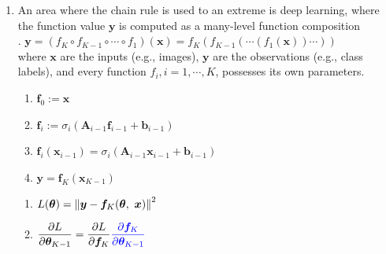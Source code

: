 \begin{enumerate}
    \item An area where the chain rule is used to an extreme is deep learning, where the function value $\bm{y}$ is computed as a many-level function composition
    \hfill \cite{mfml/book/mml/Deisenroth-Faisal-Ong}
    \\
    .\hfill
    $
        \bm{y}
        = (f_K \circ f_{K-1} \circ \cdots \circ f_1)(\bm{x})
        = f_K (f_{K-1}(\cdots (f_1(\bm{x}))\cdots))
    $
    \hfill \cite{mfml/book/mml/Deisenroth-Faisal-Ong}
    \\
    where $\bm{x}$ are the inputs (e.g., images), $\bm{y}$ are the observations (e.g., class labels), and every function $f_i, i = 1, \cdots , K$, possesses its own parameters.
    \hfill \cite{mfml/book/mml/Deisenroth-Faisal-Ong}
    \\
    \begin{multicols}{2}
    \begin{enumerate}[series=grad-dnn]
        \item $\bm{f}_0 := \bm{x}$
        \hfill \cite{mfml/book/mml/Deisenroth-Faisal-Ong}

        \item $\bm{f}_i := \sigma_i(\bm{A}_{i-1}\bm{f}_{i-1} + \bm{b}_{i-1})$
        \hfill \cite{mfml/book/mml/Deisenroth-Faisal-Ong}

        \item $\bm{f}_i(\bm{x}_{i-1}) = \sigma_i(\bm{A}_{i-1}\bm{x}_{i-1} + \bm{b}_{i-1})$
        \hfill \cite{mfml/book/mml/Deisenroth-Faisal-Ong}

        \item $\bm{y} = \bm{f}_K(\bm{x}_{K-1})$
        \hfill \cite{mfml/book/mml/Deisenroth-Faisal-Ong}
    \end{enumerate}
    \end{multicols}
    \begin{multicols}{2}
    \begin{enumerate}[resume*=grad-dnn]
        \item $L(\bm{\theta}) = \left\| \bm{y} - \bm{f}_K(\bm{\theta},\ \bm{x}) \right\|^2$
        \hfill \cite{mfml/book/mml/Deisenroth-Faisal-Ong}

        \item
        $
            \dfrac{\partial L}{\partial \bm{\theta}_{K-1}}
            = \dfrac{\partial L}{\partial \bm{f}_K} \textcolor{blue}{\dfrac{\partial \bm{f}_K}{\partial \bm{\theta}_{K-1}}}
        $
        \hfill \cite{mfml/book/mml/Deisenroth-Faisal-Ong}


\end{enumerate}
\end{multicols}
\end{enumerate}
